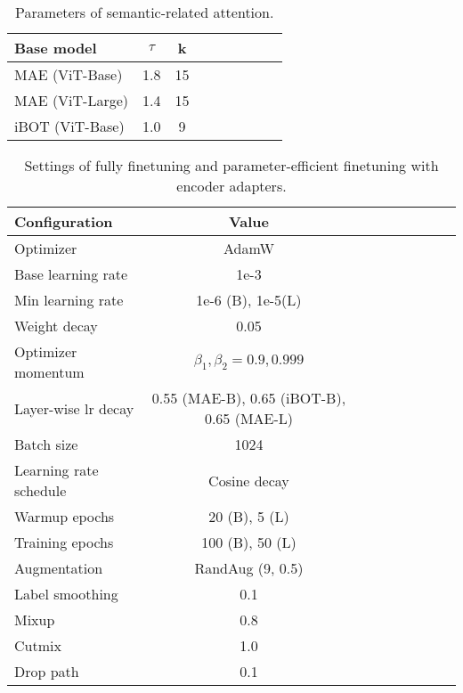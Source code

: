 \documentclass{article} \usepackage{iclr2023_conference,times}
\begin{document}
\begin{table}[]
	\centering
	\setlength{\tabcolsep}{10mm}
	\caption{Parameters of semantic-related attention.
	}
	\small
	\begin{tabular}{lcccccccc}
		\toprule
        Base model       &$\tau$ & k \\	\midrule
        MAE (ViT-Base) & 1.8 & 15  \\
        MAE (ViT-Large) & 1.4 & 15  \\
        iBOT (ViT-Base) & 1.0 & 9  \\
		\bottomrule
	\end{tabular}
	\label{tab:sem_att_weights}
	\vspace{-15pt}
\end{table}
\begin{table}[]
	\centering
	\setlength{\tabcolsep}{8mm}
	\caption{Settings of fully finetuning and parameter-efficient finetuning with encoder adapters.
	}
	\small
	\begin{tabular}{lcccccccc}
		\toprule
        Configuration      & Value \\	\midrule
        Optimizer & AdamW \\
        Base learning rate & 1e-3 \\
        Min learning rate & 1e-6 (B), 1e-5(L)  \\
        Weight decay & 0.05 \\
        Optimizer momentum & $\beta_1, \beta_2{=}0.9, 0.999$ \\
        Layer-wise lr decay  & 0.55 (MAE-B), 0.65 (iBOT-B), 0.65 (MAE-L)  \\
        Batch size & 1024 \\
        Learning rate schedule & Cosine decay \\
        Warmup epochs & 20 (B), 5 (L) \\
        Training epochs & 100 (B), 50 (L) \\
        Augmentation & RandAug (9, 0.5)  \\
        Label smoothing & 0.1 \\
        Mixup  & 0.8 \\
        Cutmix  & 1.0 \\
        Drop path  & 0.1 \\
		\bottomrule
	\end{tabular}
	\label{tab:finetune}
\end{table}
\end{document}
